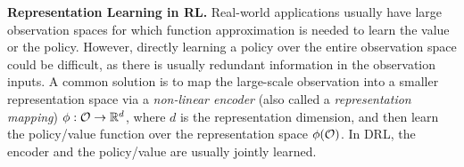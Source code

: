 \textbf{Representation Learning in RL.}
Real-world applications usually have large observation spaces for which function approximation is needed to learn the value or the policy. 
However, directly learning a policy over the entire observation space could be difficult, as there is usually redundant information in the observation inputs. A common solution is to map the large-scale observation into a smaller representation space via a \textit{non-linear encoder} (also called a \textit{representation mapping}) $\phi: \mathcal{O} \to \mathbb{R}^d$, where $d$ is the representation dimension, 
and then learn the policy/value function over the representation space $\phi(\mathcal{O})$. In DRL, the encoder and the policy/value are usually jointly learned.
